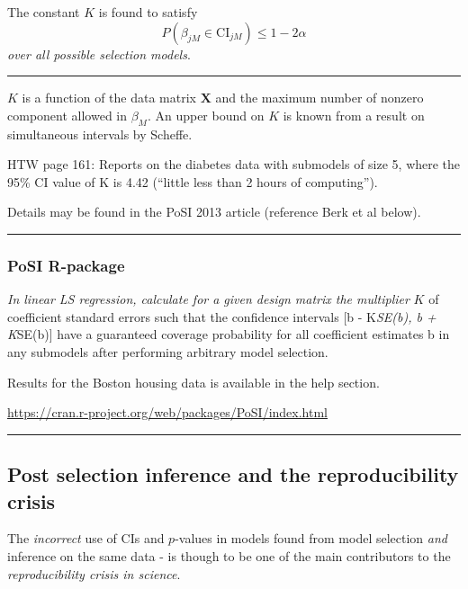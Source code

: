 \documentclass[
  letterpaper,
  DIV=11,
  numbers=noendperiod]{scrartcl}
\begin{document}
The constant \(K\) is found to satisfy
\[ P(\beta_{jM}\in \text{CI}_{jM}) \le 1-2\alpha\] \emph{over all
possible selection models}.

\begin{center}\rule{0.5\linewidth}{0.5pt}\end{center}

\(K\) is a function of the data matrix \({\boldsymbol X}\) and the
maximum number of nonzero component allowed in \(\beta_M\). An upper
bound on \(K\) is known from a result on simultaneous intervals by
Scheffe.

HTW page 161: Reports on the diabetes data with submodels of size 5,
where the 95\% CI value of K is 4.42 (``little less than 2 hours of
computing'').

Details may be found in the PoSI 2013 article (reference Berk et al
below).

\begin{center}\rule{0.5\linewidth}{0.5pt}\end{center}

\hypertarget{posi-r-package}{%
\subsubsection{PoSI R-package}\label{posi-r-package}}

\emph{In linear LS regression, calculate for a given design matrix the
multiplier} \(K\) of coefficient standard errors such that the
confidence intervals {[}b - K\emph{SE(b), b + K}SE(b){]} have a
guaranteed coverage probability for all coefficient estimates b in any
submodels after performing arbitrary model selection.

Results for the Boston housing data is available in the help section.

\url{https://cran.r-project.org/web/packages/PoSI/index.html}

\begin{center}\rule{0.5\linewidth}{0.5pt}\end{center}

\hypertarget{post-selection-inference-and-the-reproducibility-crisis}{%
\subsection{Post selection inference and the reproducibility
crisis}\label{post-selection-inference-and-the-reproducibility-crisis}}

The \emph{incorrect} use of CIs and \(p\)-values in models found from
model selection \emph{and} inference on the same data - is though to be
one of the main contributors to the \emph{reproducibility crisis in
science}.
\end{document}
